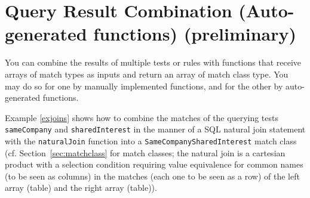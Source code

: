 \section{Query Result Combination (Auto-generated functions) (preliminary)}

You can combine the results of multiple tests or rules with functions that receive arrays of match types as inputs and return an array of match class type.
You may do so for one by manually implemented functions, and for the other by auto-generated functions.

Example \ref{exjoins} shows how to combine the matches of the querying tests \texttt{sameCompany} and \texttt{sharedInterest} in the manner of a SQL natural join statement with the \texttt{naturalJoin} function into a \texttt{SameCompanySharedInterest} match class (cf. Section~\ref{sec:matchclass} for match classes; the natural join is a cartesian product with a selection condition requiring value equivalence for common names (to be seen as columns) in the matches (each one to be seen as a row) of the left array (table) and the right array (table)).

